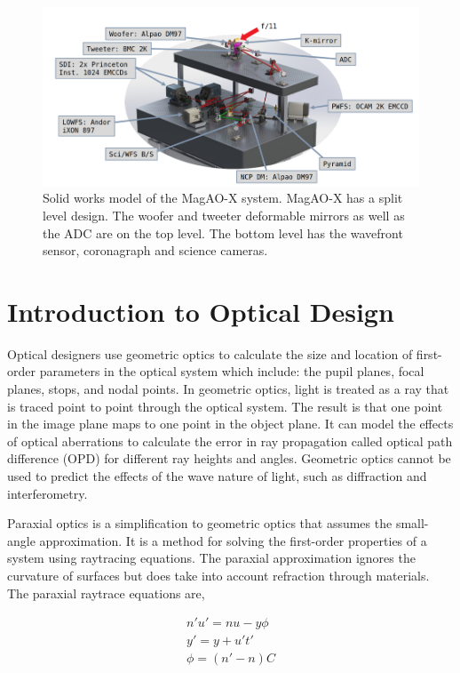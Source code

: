 \begin{figure}
    \centering
    \includegraphics[width=1\textwidth]{Chapter Materials/Chapter Five Materials/magaox.jpg}
    \caption{Solid works model of the MagAO-X system. MagAO-X has a split level design. The woofer and tweeter deformable mirrors as well as the ADC are on the top level. The bottom level has the wavefront sensor, coronagraph and science cameras.}
    \label{fig:magaox}
\end{figure}

\section{Introduction to Optical Design}

Optical designers use geometric optics to calculate the size and location of first-order parameters in the optical system which include: the pupil planes, focal planes, stops, and nodal points. In geometric optics, light is treated as a ray that is traced point to point through the optical system. The result is that one point in the image plane maps to one point in the object plane. It can model the effects of optical aberrations to calculate the error in ray propagation called optical path difference (OPD) for different ray heights and angles. Geometric optics cannot be used to predict the effects of the wave nature of light, such as diffraction and interferometry. 

Paraxial optics is a simplification to geometric optics that assumes the small-angle approximation. It is a method for solving the first-order properties of a system using raytracing equations. The paraxial approximation ignores the curvature of surfaces but does take into account refraction through materials. The paraxial raytrace equations are,

\begin{eqnarray}
       n'u'=nu -y\phi  \label{4PWFSslopes} \\
       y'=y+u't' \nonumber \\
       \phi =(n'-n)C
\end{eqnarray}

